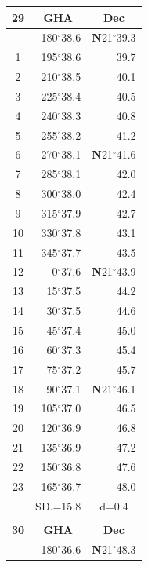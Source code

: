 \documentclass[10pt, a4paper]{report}
\begin{document}
\begin{scriptsize}
\begin{tabular*}{0.2\textwidth}[t]{@{\extracolsep{\fill}}|c|rr|}
\hline
\multicolumn{1}{|c|}{\rule{0pt}{2.6ex}\textbf{29}} & \multicolumn{1}{c}{\textbf{GHA}} & \multicolumn{1}{c|}{\textbf{Dec}}\\
\hline\rule{0pt}{2.6ex}\noindent
0 & 180$^\circ$38.6 & \textbf{N}21$^\circ$39.3\\
1 & 195$^\circ$38.6 & 39.7\\
2 & 210$^\circ$38.5 & 40.1\\
3 & 225$^\circ$38.4 & \raisebox{0.24ex}{\boldmath$\cdot$~\boldmath$\cdot$~~}40.5\\
4 & 240$^\circ$38.3 & 40.8\\
5 & 255$^\circ$38.2 & 41.2\\[2Pt]
6 & 270$^\circ$38.1 & \textbf{N}21$^\circ$41.6\\
7 & 285$^\circ$38.1 & 42.0\\
8 & 300$^\circ$38.0 & 42.4\\
9 & 315$^\circ$37.9 & \raisebox{0.24ex}{\boldmath$\cdot$~\boldmath$\cdot$~~}42.7\\
10 & 330$^\circ$37.8 & 43.1\\
11 & 345$^\circ$37.7 & 43.5\\[2Pt]
12 & 0$^\circ$37.6 & \textbf{N}21$^\circ$43.9\\
13 & 15$^\circ$37.5 & 44.2\\
14 & 30$^\circ$37.5 & 44.6\\
15 & 45$^\circ$37.4 & \raisebox{0.24ex}{\boldmath$\cdot$~\boldmath$\cdot$~~}45.0\\
16 & 60$^\circ$37.3 & 45.4\\
17 & 75$^\circ$37.2 & 45.7\\[2Pt]
18 & 90$^\circ$37.1 & \textbf{N}21$^\circ$46.1\\
19 & 105$^\circ$37.0 & 46.5\\
20 & 120$^\circ$36.9 & 46.8\\
21 & 135$^\circ$36.9 & \raisebox{0.24ex}{\boldmath$\cdot$~\boldmath$\cdot$~~}47.2\\
22 & 150$^\circ$36.8 & 47.6\\
23 & 165$^\circ$36.7 & 48.0\\
\hline
\rule{0pt}{2.4ex} & \multicolumn{1}{c}{SD.=15.8} & \multicolumn{1}{c|}{d=0.4}\\
\hline
\multicolumn{1}{c}{}\\[-0.5ex]\hline
\multicolumn{1}{|c|}{\rule{0pt}{2.6ex}\textbf{30}} & \multicolumn{1}{c}{\textbf{GHA}} & \multicolumn{1}{c|}{\textbf{Dec}}\\
\hline\rule{0pt}{2.6ex}\noindent
0 & 180$^\circ$36.6 & \textbf{N}21$^\circ$48.3\\

\end{tabular*}
\end{scriptsize}
\end{document}
